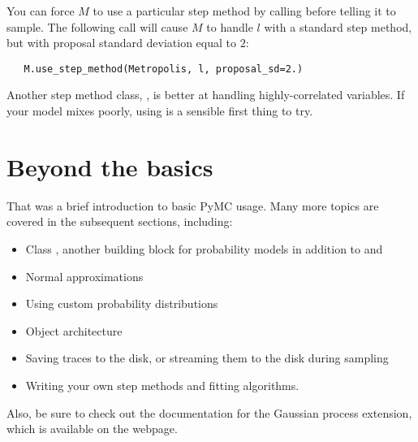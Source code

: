 You can force $M$ to use a particular step method by calling  before telling it to sample. The following call will cause $M$ to handle $l$ with a standard  step method, but with proposal standard deviation equal to $2$:
\begin{verbatim}
   M.use_step_method(Metropolis, l, proposal_sd=2.)
\end{verbatim}

Another step method class, , is better at handling highly-correlated variables. If your model mixes poorly, using  is a sensible first thing to try.

\section{Beyond the basics}
That was a brief introduction to basic PyMC usage. Many more topics are covered in the subsequent sections, including:
\begin{itemize}
   \item Class , another building block for probability models in addition to  and 
   \item Normal approximations
   \item Using custom probability distributions
   \item Object architecture
   \item Saving traces to the disk, or streaming them to the disk during sampling
   \item Writing your own step methods and fitting algorithms.
\end{itemize}
Also, be sure to check out the documentation for the Gaussian process extension, which is available on the webpage.
